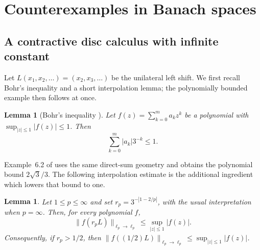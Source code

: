 \documentclass[10pt,a4paper]{amsart}
\newtheorem{lemma}[theorem]{Lemma}
\begin{document}
\section{Counterexamples in Banach spaces}\label{sec:counterexamples}

\subsection{A contractive disc calculus with infinite constant}\label{sec:polynomially-bounded}

Let $L(x_1,x_2,\ldots)=(x_2,x_3,\ldots)$ be the unilateral left shift.  We first recall Bohr's inequality and a short interpolation lemma; the polynomially bounded example then follows at once.

\begin{lemma}[Bohr's inequality \cite{Bohr}]\label{lem:bohr}
Let $f(z)=\sum_{k=0}^m a_kz^k$ be a polynomial with $\sup_{|z|\leqslant1}|f(z)|\leqslant1$.  Then
\[
       \sum_{k=0}^m |a_k|3^{-k}\leqslant1.
\]
\end{lemma}

Example~6.2 of \cite{BHDVW} uses the same direct-sum geometry and obtains the polynomial bound $2\sqrt3/3$.  The following interpolation estimate is the additional ingredient which lowers that bound to one.

\begin{lemma}\label{lem:interpolation}
Let $1\leqslant p\leqslant\infty$ and set $r_p=3^{-|1-2/p|}$, with the usual interpretation when $p=\infty$.  Then, for every polynomial $f$,
\[
       \|f(r_pL)\|_{\ell_p\to\ell_p}\leqslant\sup_{|z|\leqslant1}|f(z)|.
\]
Consequently, if $r_p>1/2$, then $\|f((1/2)L)\|_{\ell_p\to\ell_p}\leqslant\sup_{|z|\leqslant1}|f(z)|$.
\end{lemma}
\end{document}

